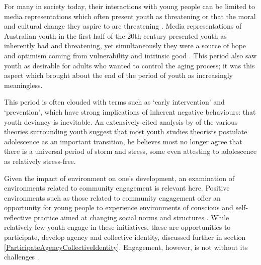For many in society today, their interactions with young people can be limited to media representations which often present youth as threatening or that the moral and cultural change they aspire to are threatening \citep[][p18]{Wyn1997}. Media representations of Australian youth in the first half of the 20th century presented youth as inherently bad and threatening, yet simultaneously they were a source of hope and optimism coming from vulnerability and intrinsic good \citep[][p18]{Wyn1997}. This period also saw youth as desirable for adults who wanted to control the aging process; it was this aspect which brought about the end of the period of youth as increasingly meaningless.

This period is often clouded with terms such as `early intervention' and `prevention', which have strong implications of inherent negative behaviours: that youth deviancy is inevitable. An extensively cited analysis by \citet{Muuss1975} of the various theories surrounding youth suggest that most youth studies theorists postulate adolescence as an important transition, he believes most no longer agree that there is a universal period of storm and stress, some even attesting to adolescence as relatively stress-free. 

Given the impact of environment on one's development, an examination of environments related to community engagement is relevant here. Positive environments such as those related to community engagement offer an opportunity for young people to experience environments of conscious and self-reflective practice aimed at changing social norms and structures \citep[][p317]{White1998}. While relatively few youth engage in these initiatives, these are opportunities to participate, develop agency and collective identity, discussed further in section \ref{ParticipateAgencyCollectiveIdentity}. Engagement, however, is not without its challenges \citep[][]{White1998}.



